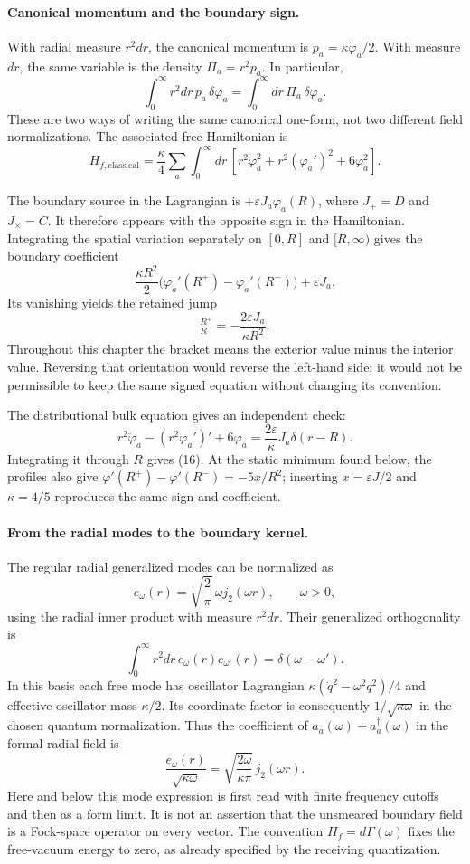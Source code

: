 \documentclass[10pt,twocolumn,letterpaper]{article}
\begin{document}
\paragraph{Canonical momentum and the boundary sign.}
With radial measure $r^2dr$, the canonical momentum is
$p_a=\kappa\dot\varphi_a/2$. With measure $dr$, the same variable is the
density $\Pi_a=r^2p_a$.  In particular,
\[
\int_0^\infty r^2dr\,p_a\,\delta\varphi_a
=\int_0^\infty dr\,\Pi_a\,\delta\varphi_a.
\]
These are two ways of writing the same canonical one-form, not two
different field normalizations.  The associated free Hamiltonian is
\[
H_{f,\mathrm{classical}}=
\frac{\kappa}{4}\sum_a\int_0^\infty dr\,
\left[r^2\dot\varphi_a^2+r^2(\varphi_a')^2+6\varphi_a^2\right].
\]

The boundary source in the Lagrangian is
$+\varepsilon J_a\varphi_a(R)$, where $J_+=D$ and $J_\times=C$.
It therefore appears with the opposite sign in the Hamiltonian.
Integrating the spatial variation separately on $[0,R]$ and
$[R,\infty)$ gives the boundary coefficient
\[
\frac{\kappa R^2}{2}
\bigl(\varphi_a'(R^+)-\varphi_a'(R^-)\bigr)
+\varepsilon J_a.
\]
Its vanishing yields the retained jump
\begin{equation}
[\partial_r\varphi_a]_{R^-}^{R^+}=-\frac{2\varepsilon J_a}{\kappa R^2}.\tag{16}
\end{equation}
Throughout this chapter the bracket means the exterior value minus the
interior value.  Reversing that orientation would reverse the left-hand
side; it would not be permissible to keep the same signed equation
without changing its convention.

The distributional bulk equation gives an independent check:
\[
r^2\ddot\varphi_a-(r^2\varphi_a')'+6\varphi_a
=\frac{2\varepsilon}{\kappa}J_a\delta(r-R).
\]
Integrating it through $R$ gives (16).  At the static minimum found below,
the profiles also give
$\varphi'(R^+)-\varphi'(R^-)=-5x/R^2$; inserting
$x=\varepsilon J/2$ and $\kappa=4/5$ reproduces the same sign and
coefficient.

\paragraph{From the radial modes to the boundary kernel.}
The regular radial generalized modes can be normalized as
\[
e_\omega(r)=\sqrt{\frac{2}{\pi}}\,\omega j_2(\omega r),
\qquad \omega>0,
\]
using the radial inner product with measure $r^2dr$.
Their generalized orthogonality is
\[
\int_0^\infty r^2dr\,e_\omega(r)e_{\omega'}(r)
=\delta(\omega-\omega').
\]
In this basis each free mode has oscillator Lagrangian
$\kappa(\dot q^2-\omega^2q^2)/4$ and effective oscillator mass
$\kappa/2$.  Its coordinate factor is consequently
$1/\sqrt{\kappa\omega}$ in the chosen quantum normalization.
Thus the coefficient of $a_a(\omega)+a_a^\dagger(\omega)$ in the
formal radial field is
\[
\frac{e_\omega(r)}{\sqrt{\kappa\omega}}
=\sqrt{\frac{2\omega}{\kappa\pi}}\,j_2(\omega r).
\]
Here and below this mode expression is first read with finite frequency
cutoffs and then as a form limit.  It is not an assertion that the
unsmeared boundary field is a Fock-space operator on every vector.
The convention $H_f=d\Gamma(\omega)$ fixes the free-vacuum energy to
zero, as already specified by the receiving quantization.
\end{document}
